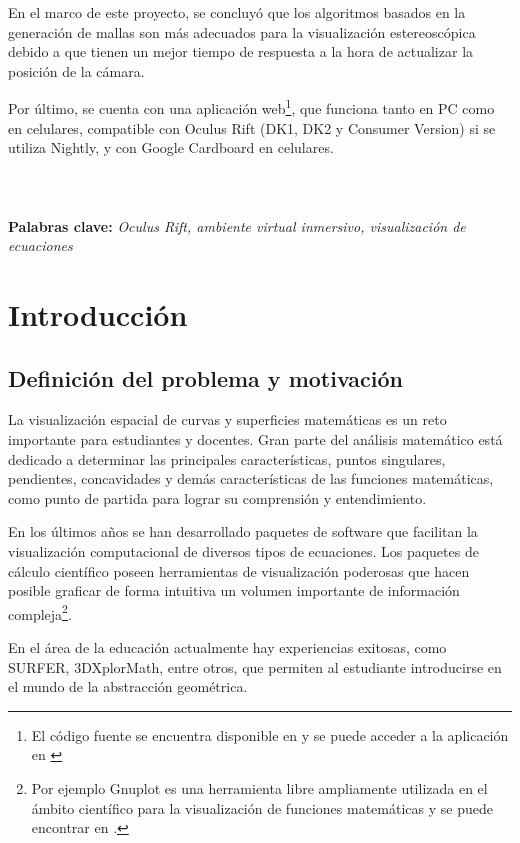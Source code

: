 \documentclass[12pt]{article}
\begin{document}
En el marco de este proyecto, se concluyó que los algoritmos basados en la generación de mallas son más adecuados para la visualización estereoscópica debido a que tienen un mejor tiempo de respuesta a la hora de actualizar la posición de la cámara.

Por último, se cuenta con una aplicación web\footnote{El código fuente se encuentra disponible en \cite{nuestrocodigo} y se puede acceder a la aplicación en \cite{nuestrositio}}, que funciona  tanto en PC como en celulares,  compatible con Oculus Rift (DK1, DK2 y Consumer Version) si se utiliza Nightly, y con Google Cardboard en celulares.
\\
\\
\\
\\
\textbf{Palabras clave:} \textit{Oculus Rift, ambiente virtual inmersivo, visualización de ecuaciones} 


\clearpage
\tableofcontents
\clearpage
\section{Introducción}

\subsection{Definición del problema y motivación}
La visualización espacial de curvas y superficies matemáticas es un reto importante para estudiantes y docentes. Gran parte del análisis matemático está dedicado a determinar las principales características, puntos singulares, pendientes, concavidades y demás características de las  funciones matemáticas, como punto de partida para lograr su comprensión y entendimiento.

En los últimos años se han desarrollado paquetes de software que facilitan la visualización computacional de diversos tipos de ecuaciones. Los paquetes de cálculo científico poseen herramientas de visualización poderosas que hacen posible graficar de forma intuitiva un volumen importante de información compleja\footnote{Por ejemplo Gnuplot es una herramienta libre ampliamente utilizada en el ámbito científico para la visualización de funciones matemáticas y se puede encontrar en \cite{gnuplot}.}.  

En el área de la educación actualmente hay experiencias exitosas, como SURFER\cite{surfer}, 3DXplorMath\cite{dxplormath}, entre otros, que permiten al estudiante introducirse en el mundo de la abstracción geométrica. 
\end{document}

